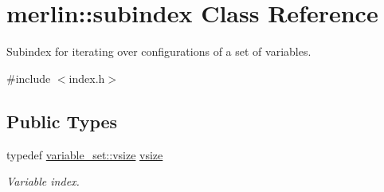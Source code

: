 \hypertarget{classmerlin_1_1subindex}{}\section{merlin\+:\+:subindex Class Reference}
\label{classmerlin_1_1subindex}


Subindex for iterating over configurations of a set of variables.  




{\ttfamily \#include $<$index.\+h$>$}

\subsection*{Public Types}
\begin{DoxyCompactItemize}
\item 
\hypertarget{classmerlin_1_1subindex_a85a7fddb94bd83a77a4a73293c5d613a}{}typedef \hyperlink{classmerlin_1_1variable__set_a05d7a8291564fa7fb236a5e9cb65c734}{variable\+\_\+set\+::vsize} \hyperlink{classmerlin_1_1subindex_a85a7fddb94bd83a77a4a73293c5d613a}{vsize}\label{classmerlin_1_1subindex_a85a7fddb94bd83a77a4a73293c5d613a}

\begin{DoxyCompactList}\small\item\em Variable index. \end{DoxyCompactList}\end{DoxyCompactItemize}
